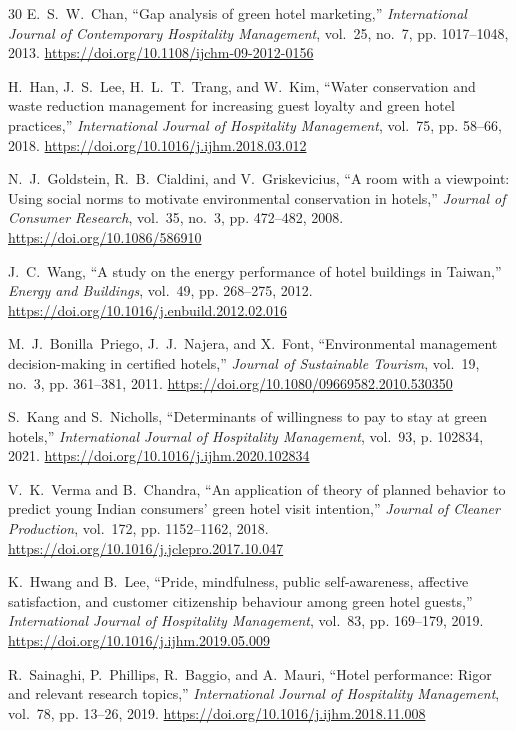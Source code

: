 \documentclass[11pt,a4paper]{article}
\begin{document}
\begin{thebibliography}{30}
E.~S.~W.~Chan, ``Gap analysis of green hotel marketing,'' \emph{International Journal of Contemporary Hospitality Management}, vol.~25, no.~7, pp. 1017--1048, 2013. \url{https://doi.org/10.1108/ijchm-09-2012-0156}

H.~Han, J.~S.~Lee, H.~L.~T.~Trang, and W.~Kim, ``Water conservation and waste reduction management for increasing guest loyalty and green hotel practices,'' \emph{International Journal of Hospitality Management}, vol.~75, pp. 58--66, 2018. \url{https://doi.org/10.1016/j.ijhm.2018.03.012}

N.~J.~Goldstein, R.~B.~Cialdini, and V.~Griskevicius, ``A room with a viewpoint: Using social norms to motivate environmental conservation in hotels,'' \emph{Journal of Consumer Research}, vol.~35, no.~3, pp. 472--482, 2008. \url{https://doi.org/10.1086/586910}

J.~C.~Wang, ``A study on the energy performance of hotel buildings in Taiwan,'' \emph{Energy and Buildings}, vol.~49, pp. 268--275, 2012. \url{https://doi.org/10.1016/j.enbuild.2012.02.016}

M.~J.~Bonilla~Priego, J.~J.~Najera, and X.~Font, ``Environmental management decision-making in certified hotels,'' \emph{Journal of Sustainable Tourism}, vol.~19, no.~3, pp. 361--381, 2011. \url{https://doi.org/10.1080/09669582.2010.530350}

S.~Kang and S.~Nicholls, ``Determinants of willingness to pay to stay at green hotels,'' \emph{International Journal of Hospitality Management}, vol.~93, p. 102834, 2021. \url{https://doi.org/10.1016/j.ijhm.2020.102834}

V.~K.~Verma and B.~Chandra, ``An application of theory of planned behavior to predict young Indian consumers' green hotel visit intention,'' \emph{Journal of Cleaner Production}, vol.~172, pp. 1152--1162, 2018. \url{https://doi.org/10.1016/j.jclepro.2017.10.047}

K.~Hwang and B.~Lee, ``Pride, mindfulness, public self-awareness, affective satisfaction, and customer citizenship behaviour among green hotel guests,'' \emph{International Journal of Hospitality Management}, vol.~83, pp. 169--179, 2019. \url{https://doi.org/10.1016/j.ijhm.2019.05.009}

R.~Sainaghi, P.~Phillips, R.~Baggio, and A.~Mauri, ``Hotel performance: Rigor and relevant research topics,'' \emph{International Journal of Hospitality Management}, vol.~78, pp. 13--26, 2019. \url{https://doi.org/10.1016/j.ijhm.2018.11.008}


\end{thebibliography}
\end{document}
